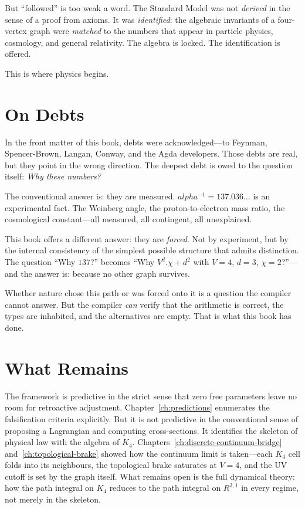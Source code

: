 \documentclass[11pt,a4paper]{book}
\def\alpha{alpha}%
\def\cdot{.}%
\def\mathbb#1{#1}%
\begin{document}
But ``followed'' is too weak a word. The Standard Model was not \emph{derived} in the sense of a proof from axioms. It was \emph{identified}: the algebraic invariants of a four-vertex graph were \emph{matched} to the numbers that appear in particle physics, cosmology, and general relativity. The algebra is locked. The identification is offered.

This is where physics begins.

\section*{On Debts}

In the front matter of this book, debts were acknowledged---to Feynman, Spencer-Brown, Langan, Conway, and the Agda developers. Those debts are real, but they point in the wrong direction. The deepest debt is owed to the question itself: \emph{Why these numbers?}

The conventional answer is: they are measured. $\alpha^{-1} = 137.036\ldots$ is an experimental fact. The Weinberg angle, the proton-to-electron mass ratio, the cosmological constant---all measured, all contingent, all unexplained.

This book offers a different answer: they are \emph{forced}. Not by experiment, but by the internal consistency of the simplest possible structure that admits distinction. The question ``Why $137$?'' becomes ``Why $V^d \cdot \chi + d^2$ with $V = 4$, $d = 3$, $\chi = 2$?''---and the answer is: because no other graph survives.

Whether nature chose this path or was forced onto it is a question the compiler cannot answer. But the compiler \emph{can} verify that the arithmetic is correct, the types are inhabited, and the alternatives are empty. That is what this book has done.

\section*{What Remains}

The framework is predictive in the strict sense that zero free parameters leave no room for retroactive adjustment. Chapter~\ref{ch:predictions} enumerates the falsification criteria explicitly. But it is not predictive in the conventional sense of proposing a Lagrangian and computing cross-sections. It identifies the skeleton of physical law with the algebra of $K_4$. Chapters~\ref{ch:discrete-continuum-bridge} and~\ref{ch:topological-brake} showed how the continuum limit is taken---each $K_4$ cell folds into its neighbours, the topological brake saturates at $V = 4$, and the UV cutoff is set by the graph itself. What remains open is the full dynamical theory: how the path integral on $K_4$ reduces to the path integral on $\mathbb{R}^{3,1}$ in every regime, not merely in the skeleton.
\end{document}
